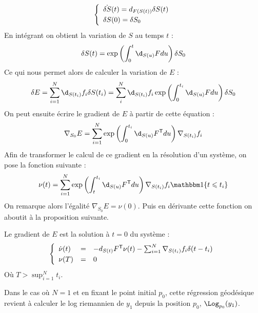 \begin{equation}
\label{eq:evol_dS}
\syst{lll}{
	\dot{\delta S}(t) = d_{F(S(t))} \delta S(t) \\[1mm]
	\delta S(0) = \delta S_0
}
\end{equation}
En intégrant on obtient la variation de $S$ au temps $t$ :
\begin{equation}
	\label{eq:dS}
	\delta S(t) = \exp \left( \int_0^{t} \d_{S(u)} F du \right) \delta S_0
\end{equation}
Ce qui nous permet alors de calculer la variation de $E$ :
\begin{equation}
	\label{eq:deltaEreg}
	\delta E = \sum_{i=1}^N \d_{S(t_i)} f_i \delta S(t_i) = \sum_{i}^N \d_{S(t_i)} f_i \exp \left( \int_0^{t_i} \d_{S(u)} F du \right) \delta S_0
\end{equation}
On peut ensuite écrire le gradient de $E$ à partir de cette équation :
\begin{equation}
	\nabla_{S_0} E = \sum_{i=1}^N \exp \left( \int_0^{t_i} \d_{S(u)} F^\trans du \right) \nabla_{S(t_i)} f_i
\end{equation}
Afin de transformer le calcul de ce gradient en la résolution d'un système, on pose la fonction suivante :
\begin{equation}
	\nu(t) = \sum_{i=1}^N \exp \left( \int_t^{t_i} \d_{S(u)} F^\trans du \right) \nabla_{S(t_i)} f_i \ind \{ t \leqslant t_i \}
\end{equation}
On remarque alors l'égalité $\nabla_{S_0} E = \nu(0)$. Puis en dérivante cette fonction on aboutit à la proposition suivante.

\begin{proposition}
	Le gradient de $E$ est la solution à $t=0$ du système :
	\begin{equation}
		\syst{lll}{
			\dot{\nu}(t) & = & - d_{S(t)} F^\trans \nu(t) - \sum_{i=1}^N \nabla_{S(t_i)} f_i \delta (t - t_i) \\[1mm]
			\nu(T) & = & 0
		}
	\end{equation}
	Où $T > \sup_{i = 1}^N t_i$.
\end{proposition}

\begin{remarque}
	Dans le cas où $N=1$ et en fixant le point initial $p_0$, cette régression géodésique revient à calculer le log riemannien de $y_1$ depuis la position $p_0$, $\Log_{p_0}(y_1)$.
\end{remarque}

